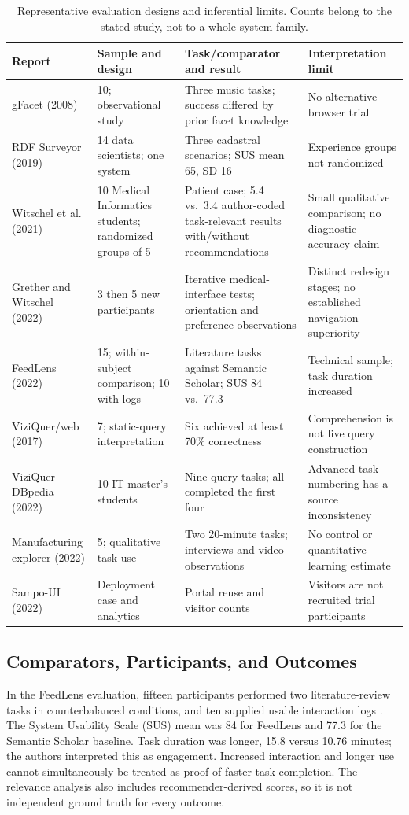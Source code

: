 \documentclass[manuscript,review,screen]{acmart}
\begin{document}
\begin{table}[htbp]
\centering\footnotesize
\caption{Representative evaluation designs and inferential limits. Counts belong to the stated study, not to a whole system family.}
\label{tab:evaluation}
\begin{tabularx}{\linewidth}{L{25mm} L{27mm} Y Y}
\toprule Report & Sample and design & Task/comparator and result & Interpretation limit\\\midrule
gFacet (2008) & 10; observational study & Three music tasks; success differed by prior facet knowledge & No alternative-browser trial\\
RDF Surveyor (2019) & 14 data scientists; one system & Three cadastral scenarios; SUS mean 65, SD 16 & Experience groups not randomized\\
Witschel et al. (2021) & 10 Medical Informatics students; randomized groups of 5 & Patient case; 5.4 vs.\ 3.4 author-coded task-relevant results with/without recommendations & Small qualitative comparison; no diagnostic-accuracy claim\\
Grether and Witschel (2022) & 3 then 5 new participants & Iterative medical-interface tests; orientation and preference observations & Distinct redesign stages; no established navigation superiority\\
FeedLens (2022) & 15; within-subject comparison; 10 with logs & Literature tasks against Semantic Scholar; SUS 84 vs.\ 77.3 & Technical sample; task duration increased\\
ViziQuer/web (2017) & 7; static-query interpretation & Six achieved at least 70\% correctness & Comprehension is not live query construction\\
ViziQuer DBpedia (2022) & 10 IT master's students & Nine query tasks; all completed the first four & Advanced-task numbering has a source inconsistency\\
Manufacturing explorer (2022) & 5; qualitative task use & Two 20-minute tasks; interviews and video observations & No control or quantitative learning estimate\\
Sampo-UI (2022) & Deployment case and analytics & Portal reuse and visitor counts & Visitors are not recruited trial participants\\\bottomrule
\end{tabularx}
\end{table}

\subsection{Comparators, Participants, and Outcomes}
In the FeedLens evaluation, fifteen participants performed two literature-review tasks in counterbalanced conditions, and ten supplied usable interaction logs \citep{V3-01126}. The System Usability Scale (SUS) mean was 84 for FeedLens and 77.3 for the Semantic Scholar baseline. Task duration was longer, 15.8 versus 10.76 minutes; the authors interpreted this as engagement. Increased interaction and longer use cannot simultaneously be treated as proof of faster task completion. The relevance analysis also includes recommender-derived scores, so it is not independent ground truth for every outcome.
\end{document}
